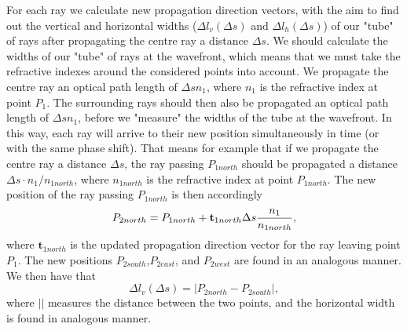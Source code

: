 For each ray we calculate new propagation direction vectors, with the aim to find out the vertical and horizontal widths 
(\(\Delta l_{v}(\Delta s)\) and \(\Delta l_{h}(\Delta s)\)) 
of our "tube" of rays after propagating the centre ray a distance \(\Delta s\).
We should calculate the widths of our "tube" of rays at the wavefront,
which means that we must take the refractive indexes around the
considered points into account.
We propagate the centre ray an optical path length
of \(\Delta s\)\(n_{1}\), where \(n_{1}\) is the refractive index
at point \(P_{1}\). 
The surrounding rays should then also
be propagated an optical path length of \(\Delta s\)\(n_{1}\),
before we "measure" the widths of the tube at the wavefront.
In this way, each ray will arrive  to their new position 
simultaneously in time (or with the same phase shift).
That means for example that if we propagate the centre ray a distance 
\(\Delta s\),
the ray passing \(P_{1north}\) should be propagated
a distance  \(\Delta s \cdot n_{1} / n_{1north}\), where 
\(n_{1north}\) is the refractive index at point \( P_{1north}\).
The new position of the ray passing \(P_{1north}\) is then accordingly
\begin{equation}
P_{2north}=P_{1north}+{\bf{t}}_{1north}\Delta s \frac{n_{1}}{n_{1north}},
\end{equation}
where \(\mathbf{t}_{1north}\) is the updated propagation direction vector 
for the ray leaving point \(P_{1}\). The new positions \(P_{2south}\),\(P_{2east}\), and \(P_{2west}\)
are found in an analogous manner. 
We then have that
\begin{equation}
\Delta l_{v}(\Delta s)=|P_{2north}-P_{2south}|,
\end{equation}
where \(| |\) measures the distance between the two points, and 
the horizontal width is found in analogous manner.
